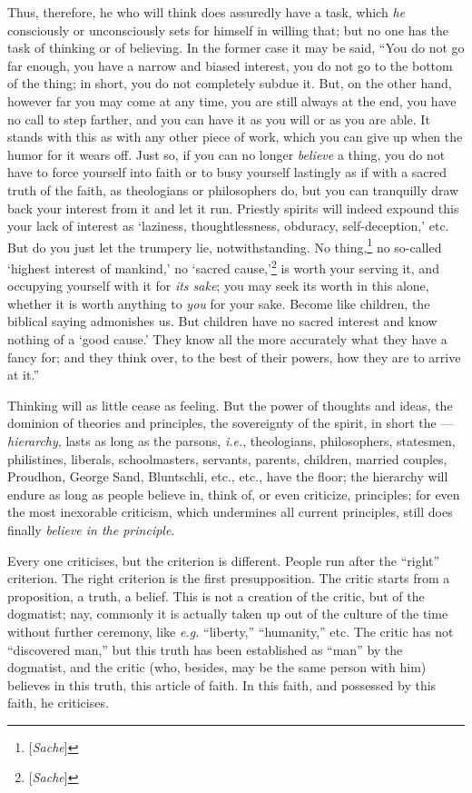 Thus, therefore, he who will think does assuredly have a task, which 
\textit{he} consciously or unconsciously sets for himself in willing that; but 
no one has the task of thinking or of believing. In the former case it may be 
said, ``You do not go far enough, you have a narrow and biased interest, you 
do not go to the bottom of the thing; in short, you do not completely subdue 
it. But, on the other hand, however far you may come at any time, you are 
still always at the end, you have no call to step farther, and you can have it 
as you will or as you are able. It stands with this as with any other piece of 
work, which you can give up when the humor for it wears off. Just so, if you 
can no longer \textit{believe} a thing, you do not have to force yourself into 
faith or to busy yourself lastingly as if with a sacred truth of the faith, as 
theologians or philosophers do, but you can tranquilly draw back your interest 
from it and let it run. Priestly spirits will indeed expound this your lack of 
interest as `laziness, thoughtlessness, obduracy, self-deception,' etc. 
But do you just let the trumpery lie, notwithstanding. No 
thing,\footnote{[\textit{Sache}]} no so-called `highest interest of 
mankind,' no `sacred cause,'\footnote{[\textit{Sache}]} is worth your 
serving it, and occupying yourself with it for \textit{its sake}; you may seek 
its worth in this alone, whether it is worth anything to \textit{you} for your 
sake. Become like children, the biblical saying admonishes us. But children 
have no sacred interest and know nothing of a `good cause.' They know all 
the more accurately what they have a fancy for; and they think over, to the 
best of their powers, how they are to arrive at it.''

Thinking will as little cease as feeling. But the power of thoughts and ideas, 
the dominion of theories and principles, the sovereignty of the spirit, in 
short the --- \textit{hierarchy}, lasts as long as the parsons, \textit{i.e.}, 
theologians, philosophers, statesmen, philistines, liberals, schoolmasters, 
servants, parents, children, married couples, Proudhon, George Sand, 
Bluntschli, etc., etc., have the floor; the hierarchy will endure as long as 
people believe in, think of, or even criticize, principles; for even the most 
inexorable criticism, which undermines all current principles, still does 
finally \textit{believe in the principle}.

Every one criticises, but the criterion is different. People run after the 
``right'' criterion. The right criterion is the first presupposition. The 
critic starts from a proposition, a truth, a belief. This is not a creation of 
the critic, but of the dogmatist; nay, commonly it is actually taken up out of 
the culture of the time without further ceremony, like \textit{e.g.} 
``liberty,'' ``humanity,'' etc. The critic has not ``discovered man,'' 
but this truth has been established as ``man'' by the dogmatist, and the 
critic (who, besides, may be the same person with him) believes in this truth, 
this article of faith. In this faith, and possessed by this faith, he 
criticises.

